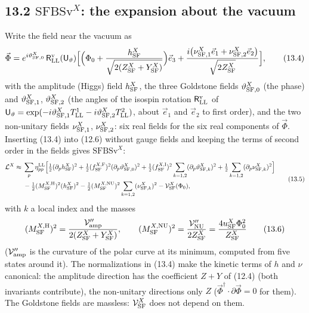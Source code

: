 \documentclass[
  10pt,
]{article}
\begin{document}
\hypertarget{mathrmsfbsvx-the-expansion-about-the-vacuum}{%
\subsection{\texorpdfstring{13.2 \(\mathrm{SFBSv}^X\): the expansion
about the
vacuum}{13.2 \textbackslash mathrm\{SFBSv\}\^{}X: the expansion about the vacuum}}\label{mathrmsfbsvx-the-expansion-about-the-vacuum}}

Write the field near the vacuum as
\[\vec\Phi=e^{i\vartheta^X_{{\rm SF},0}}\,\mathsf R^{\rm v}_{\rm LL}(\mathsf U_{\vartheta})\Big[\Big(\Phi_0+\frac{h^X_{\rm SF}}{\sqrt{2(Z^X_{\rm SF}+Y^X_{\rm SF})}}\Big)\vec e_3+\frac{i\big(\nu^X_{{\rm SF},1}\vec e_1+\nu^X_{{\rm SF},2}\vec e_2\big)}{\sqrt{2Z^X_{\rm SF}}}\Big],\tag{13.4}\]
with the amplitude (Higgs) field \(h^X_{\rm SF}\), the three Goldstone
fields \(\vartheta^X_{{\rm SF},0}\) (the phase) and
\(\vartheta^X_{{\rm SF},1}\), \(\vartheta^X_{{\rm SF},2}\) (the angles
of the isospin rotation \(\mathsf R^{\rm v}_{\rm LL}\) of
\(\mathsf U_\vartheta=\exp(-i\vartheta^X_{{\rm SF},1}T^1_{\rm LL}-i\vartheta^X_{{\rm SF},2}T^2_{\rm LL})\),
about \(\vec e_1\) and \(\vec e_2\) to first order), and the two
non-unitary fields \(\nu^X_{{\rm SF},1}\), \(\nu^X_{{\rm SF},2}\): six
real fields for the six real components of \(\vec\Phi\). Inserting
(13.4) into (12.6) without gauge fields and keeping the terms of second
order in the fields gives \(\mathrm{SFBSv}^X\):
\[\begin{aligned}\mathcal L^X\approx{}&\sum_p\eta^{\rm LL}_{pp}\Big[\tfrac12(\partial_ph^X_{\rm SF})^2+\tfrac12(f^{X,{\rm F}}_{\rm SF})^2(\partial_p\vartheta^X_{{\rm SF},0})^2+\tfrac12(f^{X,{\rm I}}_{\rm SF})^2\sum_{k=1,2}(\partial_p\vartheta^X_{{\rm SF},k})^2+\tfrac12\sum_{k=1,2}(\partial_p\nu^X_{{\rm SF},k})^2\Big]\\&-\tfrac12(M^{X,{\rm H}}_{\rm SF})^2(h^X_{\rm SF})^2-\tfrac12(M^{X,{\rm NU}}_{\rm SF})^2\sum_{k=1,2}(\nu^X_{{\rm SF},k})^2-\mathcal V^X_{\rm SF}(\Phi_0),\end{aligned}\tag{13.5}\]
with \(k\) a local index and the masses
\[(M^{X,{\rm H}}_{\rm SF})^2=\frac{\mathcal V''_{\rm amp}}{2(Z^X_{\rm SF}+Y^X_{\rm SF})},\qquad(M^{X,{\rm NU}}_{\rm SF})^2=\frac{\mathcal V''_{\rm NU}}{2Z^X_{\rm SF}}=\frac{4u^X_{\rm SF}\Phi_0^2}{Z^X_{\rm SF}}\tag{13.6}\]
(\(\mathcal V''_{\rm amp}\) is the curvature of the polar curve at its
minimum, computed from five states around it). The normalizations in
(13.4) make the kinetic terms of \(h\) and \(\nu\) canonical: the
amplitude direction has the coefficient \(Z+Y\) of (12.4) (both
invariants contribute), the non-unitary directions only \(Z\)
(\(\vec\Phi^\dagger\cdot\partial\vec\Phi=0\) for them). The Goldstone
fields are massless: \(\mathcal V^X_{\rm SF}\) does not depend on them.
\end{document}
